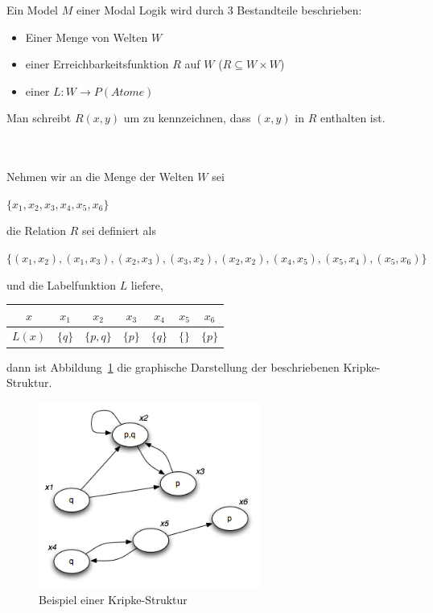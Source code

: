 \begin{definition}
	\label{def:model}
	Ein Model $M$ einer Modal Logik wird durch 3 Bestandteile beschrieben:
	\begin{itemize}
		\item Einer Menge von Welten $W$
		\item einer Erreichbarkeitsfunktion $R$ auf $W$ ($R \subseteq W \times W$)
		\item einer  $L : W \rightarrow P(Atome)$
	\end{itemize}
	Man schreibt $R(x,y)$ um zu kennzeichnen, dass $(x,y)$ in $R$ enthalten ist.
\end{definition} \cite[S.309]{huth2004logic}\\
\\
Nehmen wir an die Menge der Welten $W$ sei
\begin{center}
	$\{ x_1, x_2, x_3, x_4, x_5, x_6 \}$
\end{center}
%
%
die Relation $R$ sei definiert als 
\begin{center}
	$\{(x_1, x_2), (x_1, x_3), (x_2, x_3), (x_3, x_2), (x_2, x_2), (x_4, x_5), (x_5, x_4), (x_5, x_6)\}$ 
\end{center}
%
%
und die Labelfunktion $L$ liefere,
\begin{center}
	\begin{tabular}{c|cccccc}
		$x$ & $x_1$ & $x_2$ & $x_3$ & $x_4$ & $x_5$ & $x_6$\\
		\hline
		$L(x)$ & $\{q\}$ & $\{p,q\}$ & $\{p\}$ & $\{q\}$ & $\{\}$ & $\{p\}$
	\end{tabular}
\end{center}
%
%
dann ist Abbildung~\ref{fig:mmKripke01} die graphische Darstellung der beschriebenen Kripke-Struktur.

\begin{figure}[ht]
	\begin{center}
  	\includegraphics[width=0.65\textwidth]{./Images/Kripke01.png}
  	\caption{Beispiel einer Kripke-Struktur}
		\label{fig:mmKripke01}
	\end{center}
\end{figure}

